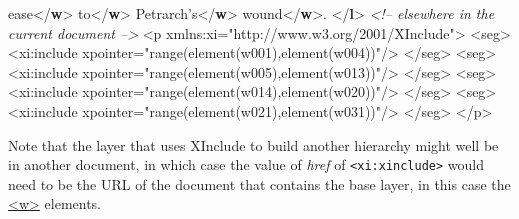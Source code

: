 \begin{shaded}
ease{</\textbf{w}>}\mbox{}\newline 
{}to{</\textbf{w}>}\mbox{}\newline 
{}Petrarch's{</\textbf{w}>}\mbox{}\newline 
{}wound{</\textbf{w}>}. \mbox{}\newline 
{</\textbf{l}>}\mbox{}\newline 
\textit{<!-- elsewhere in the current document -->}\mbox{}\newline 
 \mbox{}\newline 
 \mbox{}\newline 
 <p xmlns:xi="http://www.w3.org/2001/XInclude">\mbox{}\newline 
 <seg>\mbox{}\newline 
 <xi:include xpointer="range(element(w001),element(w004))"/>\mbox{}\newline 
 </seg>\mbox{}\newline 
 <seg>\mbox{}\newline 
 <xi:include xpointer="range(element(w005),element(w013))"/>\mbox{}\newline 
 </seg>\mbox{}\newline 
 <seg>\mbox{}\newline 
 <xi:include xpointer="range(element(w014),element(w020))"/>\mbox{}\newline 
 </seg>\mbox{}\newline 
 <seg>\mbox{}\newline 
 <xi:include xpointer="range(element(w021),element(w031))"/>\mbox{}\newline 
 </seg>\mbox{}\newline 
 </p>\mbox{}\newline 
 \mbox{}\newline 
\end{shaded}\egroup\par \noindent  Note that the layer that uses XInclude to build another hierarchy might well be in another document, in which case the value of {\itshape href} of \texttt{<xi:xinclude>} would need to be the URL of the document that contains the base layer, in this case the \hyperref[TEI.w]{<w>} elements.\par
